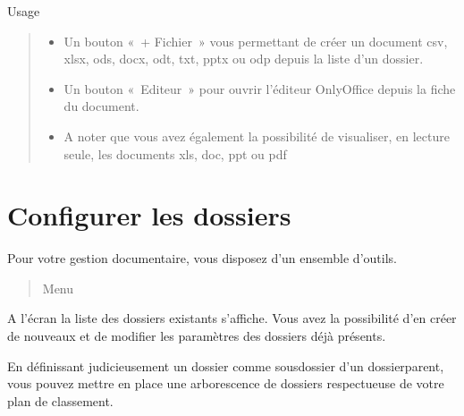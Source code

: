 \documentclass[letterpaper,10pt,french]{sphinxmanual}
\begin{document}
\sphinxAtStartPar
Usage
\begin{quote}
\begin{description}
\begin{itemize}
\item {} 
\sphinxAtStartPar
Un bouton « + Fichier » vous permettant de créer un document csv, xlsx, ods, docx, odt, txt, pptx ou odp depuis la liste d’un dossier.

\item {} 
\sphinxAtStartPar
Un bouton « Editeur » pour ouvrir l’éditeur OnlyOffice depuis la fiche du document.

\item {} 
\sphinxAtStartPar
A noter que vous avez également la possibilité de visualiser, en lecture seule, les documents xls, doc, ppt ou pdf

\end{itemize}

\end{description}
\end{quote}

\noindent{}

\sphinxstepscope


\section{Configurer les dossiers}
\label{\detokenize{documents/configuration:configurer-les-dossiers}}\label{\detokenize{documents/configuration::doc}}
\sphinxAtStartPar
Pour votre gestion documentaire, vous disposez d’un ensemble d’outils.
\begin{quote}

\sphinxAtStartPar
Menu 
\end{quote}

\sphinxAtStartPar
A l’écran la liste des dossiers existants s’affiche. Vous avez la possibilité d’en créer de nouveaux et de modifier les paramètres des dossiers déjà présents.

\noindent{}

\sphinxAtStartPar
En définissant judicieusement un dossier comme sous\sphinxhyphen{}dossier d’un dossier\sphinxhyphen{}parent, vous pouvez  mettre en place une arborescence de dossiers respectueuse de votre plan de classement.
\end{document}
